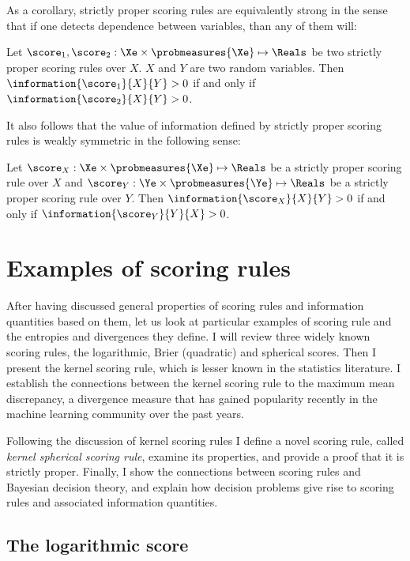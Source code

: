 As a corollary, strictly proper scoring rules are equivalently strong in the sense that if one detects dependence between variables, than any of them will:

\begin{corollary}
	Let $\score_1,\score_2:\Xe\times\probmeasures{\Xe}\mapsto\Reals$ be two strictly proper scoring rules over $X$. $X$ and $Y$ are two random variables. Then $\information{\score_1}{X}{Y} > 0$ if and only if $\information{\score_2}{X}{Y} > 0$.
\end{corollary}

It also follows that the value of information defined by strictly proper scoring rules is weakly symmetric in the following sense:

\begin{corollary}
	Let $\score_X:\Xe\times\probmeasures{\Xe}\mapsto\Reals$ be a strictly proper scoring rule over $X$ and $\score_Y:\Ye\times\probmeasures{\Ye}\mapsto\Reals$ be a strictly proper scoring rule over $Y$.  Then $\information{\score_X}{X}{Y} > 0$ if and only if $\information{\score_Y}{Y}{X} > 0$.
\end{corollary}

\section{Examples of scoring rules}

After having discussed general properties of scoring rules and information quantities based on them, let us look at particular examples of scoring rule and the entropies and divergences they define. I will review three widely known scoring rules, the logarithmic, Brier (quadratic) and spherical scores. Then I present the kernel scoring rule, which is lesser known in the statistics literature. I establish the connections between the kernel scoring rule to the maximum mean discrepancy, a divergence measure that has gained popularity recently in the machine learning community over the past years.

Following the discussion of kernel scoring rules I define a novel scoring rule, called \emph{kernel spherical scoring rule}, examine its properties, and provide a proof that it is strictly proper. Finally, I show the connections between scoring rules and Bayesian decision theory, and explain how decision problems give rise to scoring rules and associated information quantities.

\subsection{The logarithmic score}

